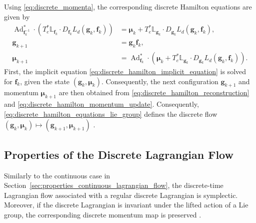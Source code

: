 Using \eqref{eq:discrete_momenta}, the corresponding discrete Hamilton equations are given by
\begin{subequations}
\label{eq:discrete_hamilton_equations_lie_group}
\begin{align}
    \operatorname{Ad}_{\bm{f}_k^{-1}}^*
    \cdot
    \left(T_e^*\mathbb{L}_{\bm{f}_k} \cdot D_{\bm{f}_k}L_d(\bm{g}_k,\bm{f}_k)\right)
    &=
    \bm{\mu}_k+T_e^*\mathbb{L}_{\bm{g}_k} \cdot D_{\bm{g}_k}L_d(\bm{g}_k,\bm{f}_k),
    \label{eq:discrete_hamilton_implicit_equation}\\
    \bm{g}_{k+1}&=\bm{g}_k\bm{f}_k,
    \label{eq:discrete_hamilton_reconstruction}\\
    \bm{\mu}_{k+1}
    &=
    \operatorname{Ad}_{\bm{f}_k}^*
    \cdot
    \left(
        \bm{\mu}_k+T_e^*\mathbb{L}_{\bm{g}_k} \cdot D_{\bm{g}_k}L_d(\bm{g}_k,\bm{f}_k)
    \right).
    \label{eq:discrete_hamilton_momentum_update}
\end{align}
\end{subequations}
First, the implicit equation 
\eqref{eq:discrete_hamilton_implicit_equation} is solved for $\bm{f}_k$, 
given the state $(\bm{g}_k,\bm{\mu}_k)$. Consequently, the next 
configuration $\bm{g}_{k+1}$ and momentum $\bm{\mu}_{k+1}$ are then obtained from 
\eqref{eq:discrete_hamilton_reconstruction} and 
\eqref{eq:discrete_hamilton_momentum_update}. 
Consequently, \eqref{eq:discrete_hamilton_equations_lie_group} defines the discrete flow 
$(\bm{g}_k,\bm{\mu}_k)\mapsto(\bm{g}_{k+1},\bm{\mu}_{k+1})$ \cite{Lee2008}.

\subsection{Properties of the Discrete Lagrangian Flow}
\label{sec:properties_discrete_lagrangian_flow}

Similarly to the continuous case in Section~\ref{sec:properties_continuous_lagrangian_flow}, 
the discrete-time Lagrangian flow associated with a regular discrete Lagrangian is symplectic. 
Moreover, if the discrete Lagrangian is invariant under the lifted action of a Lie group, the 
corresponding discrete momentum map is preserved \cite{Lee2008}.
